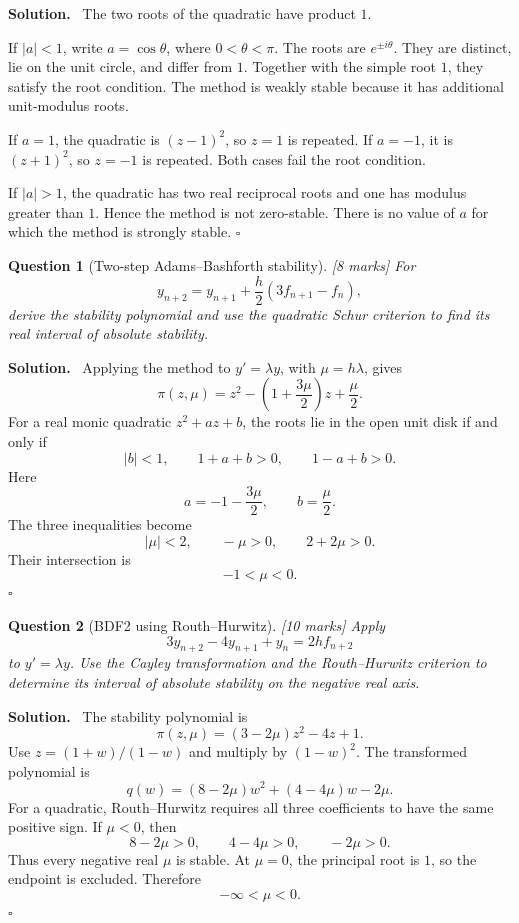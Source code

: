 \documentclass[11pt,a4paper]{article}
\theoremstyle{questionstyle}
\newtheorem{question}{Question}
\newenvironment{solution}
  {\par\noindent\textbf{\color{solutiongreen}Solution.}\ }
  {\hfill$\square$\par}
\newcommand{\pointmark}[1]{\hfill\textnormal{\textit{[#1 marks]}}}
\newcommand{\abs}[1]{\left|#1\right|}
\begin{document}
\begin{solution}
The two roots of the quadratic have product \(1\).

If \(\abs a<1\), write \(a=\cos\theta\), where
\(0<\theta<\pi\).  The roots are \(e^{\pm i\theta}\).  They are
distinct, lie on the unit circle, and differ from \(1\).  Together
with the simple root \(1\), they satisfy the root condition.  The
method is weakly stable because it has additional unit-modulus roots.

If \(a=1\), the quadratic is \((z-1)^2\), so \(z=1\) is repeated.  If
\(a=-1\), it is \((z+1)^2\), so \(z=-1\) is repeated.  Both cases fail
the root condition.

If \(\abs a>1\), the quadratic has two real reciprocal roots and one
has modulus greater than \(1\).  Hence the method is not zero-stable.
There is no value of \(a\) for which the method is strongly stable.
\end{solution}

\begin{question}[Two-step Adams--Bashforth stability]\pointmark{8}
For
\[
  y_{n+2}=y_{n+1}+\frac h2(3f_{n+1}-f_n),
\]
derive the stability polynomial and use the quadratic Schur criterion
to find its real interval of absolute stability.
\end{question}

\begin{solution}
Applying the method to \(y'=\lambda y\), with \(\mu=h\lambda\), gives
\[
  \pi(z,\mu)
  =z^2-\left(1+\frac{3\mu}{2}\right)z+\frac{\mu}{2}.
\]
For a real monic quadratic \(z^2+az+b\), the roots lie in the open
unit disk if and only if
\[
  \abs b<1,\qquad 1+a+b>0,\qquad 1-a+b>0.
\]
Here
\[
  a=-1-\frac{3\mu}{2},\qquad b=\frac{\mu}{2}.
\]
The three inequalities become
\[
  \abs\mu<2,\qquad -\mu>0,\qquad 2+2\mu>0.
\]
Their intersection is
\[
  \boxed{-1<\mu<0}.
\]
\end{solution}

\begin{question}[BDF2 using Routh--Hurwitz]\pointmark{10}
Apply
\[
  3y_{n+2}-4y_{n+1}+y_n=2hf_{n+2}
\]
to \(y'=\lambda y\).  Use the Cayley transformation and the
Routh--Hurwitz criterion to determine its interval of absolute
stability on the negative real axis.
\end{question}

\begin{solution}
The stability polynomial is
\[
  \pi(z,\mu)=(3-2\mu)z^2-4z+1.
\]
Use \(z=(1+w)/(1-w)\) and multiply by \((1-w)^2\).  The transformed
polynomial is
\[
  q(w)=(8-2\mu)w^2+(4-4\mu)w-2\mu.
\]
For a quadratic, Routh--Hurwitz requires all three coefficients to
have the same positive sign.  If \(\mu<0\), then
\[
  8-2\mu>0,\qquad 4-4\mu>0,\qquad -2\mu>0.
\]
Thus every negative real \(\mu\) is stable.  At \(\mu=0\), the
principal root is \(1\), so the endpoint is excluded.  Therefore
\[
  \boxed{-\infty<\mu<0}.
\]
\end{solution}
\end{document}
